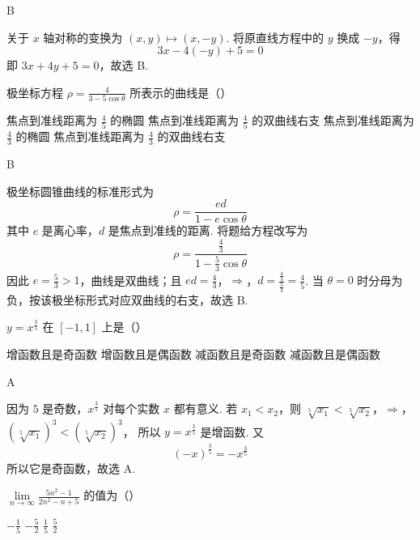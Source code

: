 \documentclass[UTF8,a4paper,oneside,11pt]{ctexbook}
\begin{document}
\begin{answer}
B
\end{answer}

\begin{solution}
关于 \(x\) 轴对称的变换为 \((x,y)\mapsto(x,-y)\). 将原直线方程中的 \(y\) 换成 \(-y\)，得
\[
3x-4(-y)+5=0
\]
即 \(3x+4y+5=0\)，故选 B.
\end{solution}

\begin{problem}
极坐标方程 \(\rho=\frac{4}{3-5\cos\theta}\) 所表示的曲线是（\quad）

\choices
    {焦点到准线距离为 \(\frac{4}{5}\) 的椭圆}
    {焦点到准线距离为 \(\frac{4}{5}\) 的双曲线右支}
    {焦点到准线距离为 \(\frac{4}{3}\) 的椭圆}
    {焦点到准线距离为 \(\frac{4}{3}\) 的双曲线右支}
\end{problem}

\begin{answer}
B
\end{answer}

\begin{solution}
极坐标圆锥曲线的标准形式为
\[
\rho=\frac{ed}{1-e\cos\theta}
\]
其中 \(e\) 是离心率，\(d\) 是焦点到准线的距离. 将题给方程改写为
\[
\rho=\frac{\frac{4}{3}}{1-\frac{5}{3}\cos\theta}
\]
因此 \(e=\frac{5}{3}>1\)，曲线是双曲线；且
\(ed=\frac{4}{3}\)，\(\Longrightarrow\)，\(d=\frac{\frac{4}{3}}{\frac{5}{3}}=\frac45\).
当 \(\theta=0\) 时分母为负，按该极坐标形式对应双曲线的右支，故选 B.
\end{solution}

\begin{problem}
\(y=x^{\frac{3}{5}}\) 在 \([-1,1]\) 上是（\quad）

\choices
    {增函数且是奇函数}
    {增函数且是偶函数}
    {减函数且是奇函数}
    {减函数且是偶函数}
\end{problem}

\begin{answer}
A
\end{answer}

\begin{solution}
因为 \(5\) 是奇数，\(x^{\frac{3}{5}}\) 对每个实数 \(x\) 都有意义. 若 \(x_1<x_2\)，则
\(\sqrt[5]{x_1}<\sqrt[5]{x_2}\)，\(\Longrightarrow\)，\(\left(\sqrt[5]{x_1}\right)^3<\left(\sqrt[5]{x_2}\right)^3\)，
所以 \(y=x^{\frac{3}{5}}\) 是增函数. 又
\[
(-x)^{\frac{3}{5}}=-x^{\frac{3}{5}}
\]
所以它是奇函数，故选 A.
\end{solution}

\begin{problem}
\(\displaystyle\lim\limits_{n\to\infty}\frac{5n^2-1}{2n^2-n+5}\) 的值为（\quad）

\choices
    {\(-\frac{1}{5}\)}
    {\(-\frac{5}{2}\)}
    {\(\frac{1}{5}\)}
    {\(\frac{5}{2}\)}
\end{problem}
\end{document}
